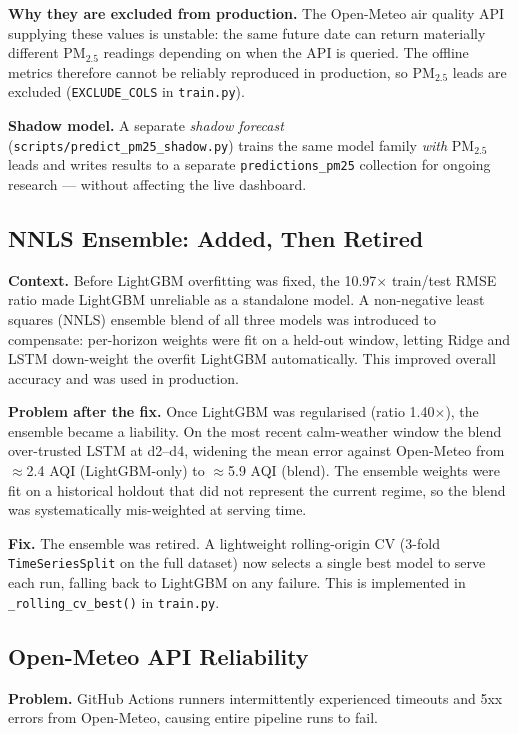 \documentclass[11pt,a4paper]{article}
\begin{document}
\textbf{Why they are excluded from production.}\; The Open-Meteo air quality
API supplying these values is unstable: the same future date can return
materially different PM$_{2.5}$ readings depending on when the API is queried.  The offline metrics
therefore cannot be reliably reproduced in production, so PM$_{2.5}$ leads are
excluded (\texttt{EXCLUDE\_COLS} in \texttt{train.py}).

\textbf{Shadow model.}\; A separate \textit{shadow forecast}
(\texttt{scripts/predict\_pm25\_shadow.py}) trains the same model family \emph{with}
PM$_{2.5}$ leads and writes results to a separate
\texttt{predictions\_pm25} collection for ongoing research — without affecting
the live dashboard.

\subsection{NNLS Ensemble: Added, Then Retired}

\textbf{Context.}\; Before LightGBM overfitting was fixed, the 10.97$\times$ train/test RMSE
ratio made LightGBM unreliable as a standalone model. A non-negative least squares (NNLS)
ensemble blend of all three models was introduced to compensate: per-horizon weights were
fit on a held-out window, letting Ridge and LSTM down-weight the overfit LightGBM
automatically. This improved overall accuracy and was used in production.

\textbf{Problem after the fix.}\; Once LightGBM was regularised (ratio 1.40$\times$), the
ensemble became a liability. On the most recent calm-weather window the blend over-trusted
LSTM at d2–d4, widening the mean error against Open-Meteo from $\approx$2.4 AQI
(LightGBM-only) to $\approx$5.9 AQI (blend). The ensemble weights were fit on a historical
holdout that did not represent the current regime, so the blend was systematically
mis-weighted at serving time.

\textbf{Fix.}\; The ensemble was retired. A lightweight rolling-origin CV (3-fold
\texttt{TimeSeriesSplit} on the full dataset) now selects a single best model to serve
each run, falling back to LightGBM on any failure. This is implemented in
\texttt{\_rolling\_cv\_best()} in \texttt{train.py}.

\subsection{Open-Meteo API Reliability}

\textbf{Problem.}\; GitHub Actions runners intermittently experienced timeouts and
5xx errors from Open-Meteo, causing entire pipeline runs to fail.
\end{document}
